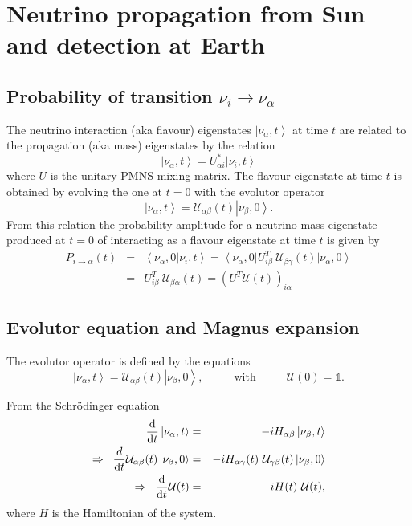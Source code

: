 \documentclass{article}
\newcommand{\de}[0]{\text{d}}
\newcommand{\ket}[1]{\left| #1 \right>}
\newcommand{\bra}[1]{\left< #1 \right|}
\newcommand{\braket}[2]{\left< #1 | #2 \right>}
\begin{document}
\section{Neutrino propagation from Sun and detection at Earth}

\subsection{Probability of transition $\nu_i \rightarrow \nu_\alpha$}
The neutrino interaction (aka flavour) eigenstates $\ket{\nu_\alpha, t}$ at time $t$ are related to the propagation (aka mass) eigenstates by the relation
\begin{equation}
	\ket{\nu_\alpha, t} = U_{\alpha i}^* \ket{\nu_i, t}
\end{equation}
where $U$ is the unitary PMNS mixing matrix. The flavour eigenstate at time $t$ is  obtained by evolving the one at $t=0$ with the evolutor operator
\begin{equation}
	\ket{\nu_\alpha, t} = \mathcal{U}_{\alpha \beta}(t) \ket{\nu_\beta,0}.
\end{equation}
From this relation the probability amplitude for a neutrino mass eigenstate produced at $t=0$ of interacting as a flavour eigenstate at time $t$ is given by
\begin{eqnarray}
	P_{i \rightarrow \alpha}(t) &=& \braket{\nu_\alpha, 0}{\nu_i,t} = \bra{\nu_\alpha, 0} U^T_{i \beta} \ \mathcal{U}_{\beta \gamma}(t) \ket{\nu_\alpha,0} \\ 
	&=& U^T_{i\beta} \ \mathcal{U}_{\beta \alpha}(t) = \left( U^T \mathcal{U}(t) \right)_{i\alpha}
\end{eqnarray}

\subsection{Evolutor equation and Magnus expansion}

The evolutor operator is defined by the equations
\begin{equation}
	\ket{\nu_\alpha, t} = \mathcal{U}_{\alpha \beta}(t) \ket{\nu_\beta, 0}, \hspace{1cm} \text{ with } \hspace{1cm} \mathcal{U}(0) = \mathbb{1}.
\end{equation}

From the Schr{\"o}dinger equation
\begin{eqnarray}
	\frac{\de}{\de t} \ket{\nu_\alpha, t}  &=& - i H_{\alpha \beta} \ket{\nu_\beta, t} \\
	\Rightarrow \hspace{0.2cm} \frac{d}{\de t} \mathcal{U}_{\alpha \beta} (t) \ket{\nu_\beta, 0} &=& -i H_{\alpha \gamma}(t)\ \mathcal{U}_{\gamma \beta}(t) \ket{\nu_\beta, 0} \\
	\Rightarrow \hspace{0.2cm} \frac{\de}{\de t} \mathcal{U}(t) &=& - i H(t)\ \mathcal{U}(t), \label{eq:evolutor}
\end{eqnarray}
where $H$ is the Hamiltonian of the system.
\end{document}

